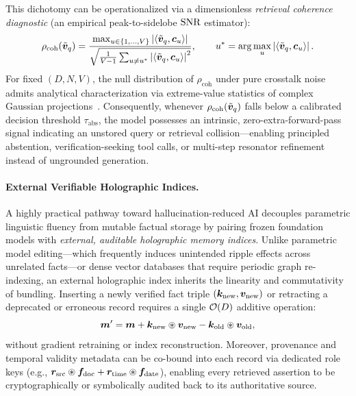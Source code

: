 This dichotomy can be operationalized via a dimensionless \emph{retrieval coherence diagnostic} (an empirical peak-to-sidelobe $\mathrm{SNR}$ estimator):
\begin{equation}\label{eq:coherence_metric}
    \rho_{\mathrm{coh}}(\tilde{\boldsymbol{v}}_q)
    = \frac{\max_{u \in \{1,\dots,V\}} \left\lvert \left\langle \tilde{\boldsymbol{v}}_q, \boldsymbol{c}_u \right\rangle \right\rvert}
           {\sqrt{\frac{1}{V-1} \sum_{u \neq u^*} \left\lvert \left\langle \tilde{\boldsymbol{v}}_q, \boldsymbol{c}_u \right\rangle \right\rvert^2}},
    \qquad u^* = \arg\max_{u} \left\lvert \left\langle \tilde{\boldsymbol{v}}_q, \boldsymbol{c}_u \right\rangle \right\rvert.
\end{equation}
For fixed $(D, N, V)$, the null distribution of $\rho_{\mathrm{coh}}$ under pure crosstalk noise admits analytical characterization via extreme-value statistics of complex Gaussian projections~\cite{FRADY_CAPACITY_VSA}.
Consequently, whenever $\rho_{\mathrm{coh}}(\tilde{\boldsymbol{v}}_q)$ falls below a calibrated decision threshold $\tau_{\mathrm{abs}}$, the model possesses an intrinsic, zero-extra-forward-pass signal indicating an unstored query or retrieval collision---enabling principled abstention, verification-seeking tool calls, or multi-step resonator refinement instead of ungrounded generation.

\paragraph{External Verifiable Holographic Indices.}
A highly practical pathway toward hallucination-reduced AI decouples parametric linguistic fluency from mutable factual storage by pairing frozen foundation models with \emph{external, auditable holographic memory indices}.
Unlike parametric model editing---which frequently induces unintended ripple effects across unrelated facts---or dense vector databases that require periodic graph re-indexing, an external holographic index inherits the linearity and commutativity of bundling.
Inserting a newly verified fact triple $(\boldsymbol{k}_{\mathrm{new}}, \boldsymbol{v}_{\mathrm{new}})$ or retracting a deprecated or erroneous record requires a single $\mathcal{O}\!\left(D\right)$ additive operation:
\begin{equation}\label{eq:holo_edit}
    \boldsymbol{m}' = \boldsymbol{m} + \boldsymbol{k}_{\mathrm{new}} \circledast \boldsymbol{v}_{\mathrm{new}} - \boldsymbol{k}_{\mathrm{old}} \circledast \boldsymbol{v}_{\mathrm{old}},
\end{equation}
without gradient retraining or index reconstruction.
Moreover, provenance and temporal validity metadata can be co-bound into each record via dedicated role keys (e.g., $\boldsymbol{r}_{\mathrm{src}} \circledast \boldsymbol{f}_{\mathrm{doc}} + \boldsymbol{r}_{\mathrm{time}} \circledast \boldsymbol{f}_{\mathrm{date}}$), enabling every retrieved assertion to be cryptographically or symbolically audited back to its authoritative source.

